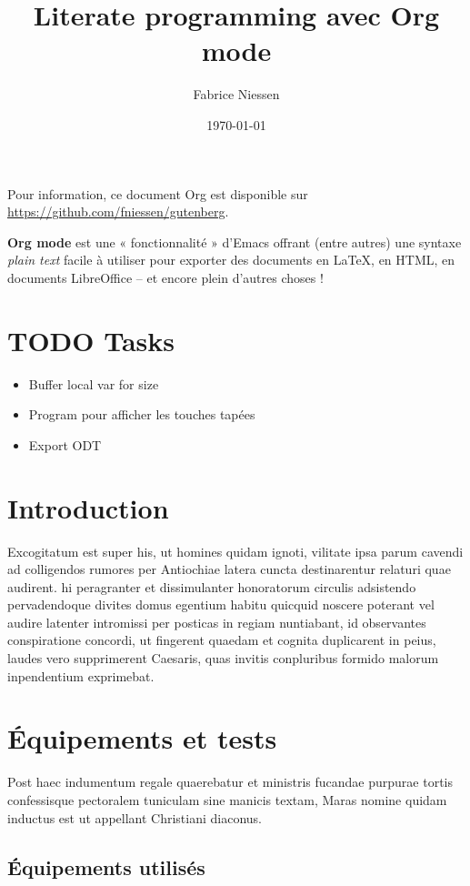 \documentclass[french]{report}
\author{Fabrice Niessen}
\date{\today}
\title{Literate programming avec Org mode}
\begin{document}
\maketitle
Pour information, ce document Org est disponible sur
\url{https://github.com/fniessen/gutenberg}.

\textbf{Org mode} est une « fonctionnalité » d'Emacs offrant (entre autres) une syntaxe
\emph{plain text} facile à utiliser pour exporter des documents en \LaTeX{}, en HTML, en
documents LibreOffice -- et encore plein d'autres choses !

\part{{\color{red}\textbf{\textsc{\textsf{TODO}}}} Tasks}
\label{sec:org36d16ba}

\begin{itemize}
\item Buffer local var for size
\item Program pour afficher les touches tapées
\item Export ODT
\end{itemize}

\part{Introduction}
\label{sec:org71377b1}

Excogitatum est super his, ut homines quidam ignoti, vilitate ipsa parum cavendi
ad colligendos rumores per Antiochiae latera cuncta destinarentur relaturi quae
audirent. hi peragranter et dissimulanter honoratorum circulis adsistendo
pervadendoque divites domus egentium habitu quicquid noscere poterant vel audire
latenter intromissi per posticas in regiam nuntiabant, id observantes
conspiratione concordi, ut fingerent quaedam et cognita duplicarent in peius,
laudes vero supprimerent Caesaris, quas invitis conpluribus formido malorum
inpendentium exprimebat.

\part{Équipements et tests}
\label{sec:orgca8f2b0}

Post haec indumentum regale quaerebatur et ministris fucandae purpurae tortis
confessisque pectoralem tuniculam sine manicis textam, Maras nomine quidam
inductus est ut appellant Christiani diaconus.

\chapter{Équipements utilisés}
\label{sec:org43a9f52}
\end{document}
